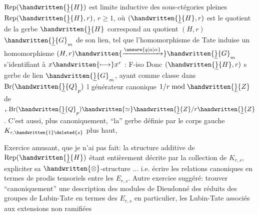 $\operatorname{Rep}(\handwritten{\underline}{H})$ est limite inductive des sous-ctégories pleines $\operatorname{Rep}(\handwritten{\underline}{H},r)$, $r\geq1$, où $(\handwritten{\underline}{H},r)$ est le quotient de la gerbe $\handwritten{\underline}{H}$ correspond au quotient $(H,r)$$\handwritten{\underline}{G}_m$ de son lien, tel que l'homomorphisme de Tate  induise un homomorphisme $(H,r)\handwritten{\xrightarrow{\unsure{q|a|\alpha}}}\handwritten{\underline}{G}_m$ s'identifiant à $x\handwritten{\longmapsto}x^r$ : F-iso Donc $(\handwritten{\underline}{H},r)$  s  gerbe de lien $\handwritten{\underline}{G}_m$, ayant comme classe dans $\operatorname{Br}(\handwritten{\underline}{Q}_p)$ l générateur canonique $1/r\bmod\handwritten{\underline}{Z}$ de ${}_r\operatorname{Br}(\handwritten{\underline}{Q}_p)\handwritten{\simeq}\handwritten{\underline}{Z}/r\handwritten{\underline}{Z}$. C\rlap{,}'est aussi, plus canoniquement, ``la'' gerbe définie par le corps gauche $K_{r,\handwritten{1}\deleted{s}}$ plus haut, 

\handwritten{[}Exercice amusant, que je n'ai pas fait: la structure additive de $\operatorname{Rep}(\handwritten{\underline}{H})$ étant entièrement décrite par la collection de $K_{r,s}$, expliciter sa $\handwritten{\otimes}$-structure ... i.e. écrire les relations canoniques en termes de prodis tensoriels entre les $E_{r,s}$. Autre exerciee suggéré: trouver ``canoniquement'' une description des modules de Dieudonné des réduits des groupes de Lubin-Tate en termes des $E_{r,s}$  \handwritten{(}en particulier, les Lubin-Tate associés aux extensions non ramifiées

